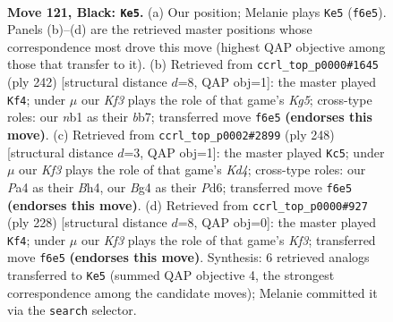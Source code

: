 \documentclass[11pt]{article}
\begin{document}
\clearpage

\begin{figure}[p]\centering
\begin{subfigure}{0.46\textwidth}\centering
\resizebox{\linewidth}{!}{%
\newchessgame
\chessboard[
  setfen={8/8/5k1B/8/p1p3b1/8/5K2/1N6 b - - 97 121},
  showmover=false,
  pgfstyle=straightmove, color=movearrow, markmove={f6-e5}
]}
\caption{}
\end{subfigure}\hfill
\begin{subfigure}{0.46\textwidth}\centering
\resizebox{\linewidth}{!}{%
\newchessgame
\chessboard[
  setfen={5B2/Pb6/4k3/2P3K1/8/8/8/8 w - - 13 122},
  showmover=false,
  pgfstyle=straightmove, color=movearrow, markmove={g5-f4}
]}
\caption{}
\end{subfigure}
\\[4pt]
\begin{subfigure}{0.46\textwidth}\centering
\resizebox{\linewidth}{!}{%
\newchessgame
\chessboard[
  setfen={2k5/6P1/3P4/8/3K3B/1b6/8/8 w - - 33 125},
  showmover=false,
  pgfstyle=straightmove, color=movearrow, markmove={d4-c5}
]}
\caption{}
\end{subfigure}\hfill
\begin{subfigure}{0.46\textwidth}\centering
\resizebox{\linewidth}{!}{%
\newchessgame
\chessboard[
  setfen={8/4k3/8/4Pp2/8/5K2/B7/6b1 w - - 3 115},
  showmover=false,
  pgfstyle=straightmove, color=movearrow, markmove={f3-f4}
]}
\caption{}
\end{subfigure}
\caption{\textbf{Move 121, Black: \texttt{Ke5}.} (a) Our position; Melanie plays \texttt{Ke5} (\texttt{f6e5}). Panels (b)--(d) are the retrieved master positions whose correspondence most drove this move (highest QAP objective among those that transfer to it). (b) Retrieved from \texttt{ccrl\_top\_p0000\#1645} (ply 242) [structural distance $d$=8, QAP obj=1]: the master played \texttt{Kf4}; under $\mu$ our \emph{Kf3} plays the role of that game's \emph{Kg5}; cross-type roles: our \emph{n}b1 as their \emph{b}b7; transferred move \texttt{f6e5} \textbf{(endorses this move)}. (c) Retrieved from \texttt{ccrl\_top\_p0002\#2899} (ply 248) [structural distance $d$=3, QAP obj=1]: the master played \texttt{Kc5}; under $\mu$ our \emph{Kf3} plays the role of that game's \emph{Kd4}; cross-type roles: our \emph{P}a4 as their \emph{B}h4, our \emph{B}g4 as their \emph{P}d6; transferred move \texttt{f6e5} \textbf{(endorses this move)}. (d) Retrieved from \texttt{ccrl\_top\_p0000\#927} (ply 228) [structural distance $d$=8, QAP obj=0]: the master played \texttt{Kf4}; under $\mu$ our \emph{Kf3} plays the role of that game's \emph{Kf3}; transferred move \texttt{f6e5} \textbf{(endorses this move)}. Synthesis: 6 retrieved analogs transferred to \texttt{Ke5} (summed QAP objective 4, the strongest correspondence among the candidate moves); Melanie committed it via the \texttt{search} selector.}
\label{fig:thought-m241}
\end{figure}
\end{document}
